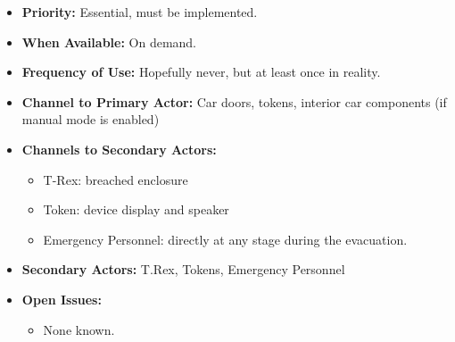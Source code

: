 \documentclass[12pt]{article}
\begin{document}
\begin{itemize}
        \item[]\textbf{Priority:}
            Essential, must be implemented.

        \item[]\textbf{When Available:}
            On demand.

        \item[]\textbf{Frequency of Use:}
            Hopefully never, but at least once in reality.

        \item[]\textbf{Channel to Primary Actor:}
            Car doors, tokens, interior car components (if manual mode is enabled)
            
        \item[]\textbf{Channels to Secondary Actors:}
            \begin{itemize}
                \item[] T-Rex: breached enclosure
                \item[] Token: device display and speaker
                \item[] Emergency Personnel: directly at any stage during the evacuation.
            \end{itemize}
        \item[]\textbf{Secondary Actors:}
            T.Rex, Tokens, Emergency Personnel

        \item[]\textbf{Open Issues:}
            \begin{itemize}
                \item[] None known.
            \end{itemize}
    \end{itemize}
    
    
    
    
\end{document}
